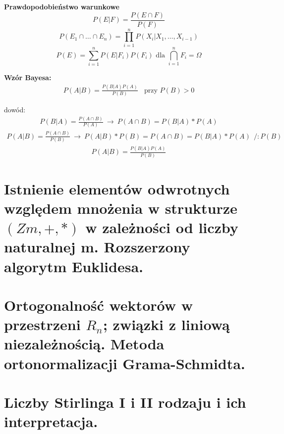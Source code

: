 \documentclass[12pt]{article}
\begin{document}
    \textbf{Prawdopodobieństwo warunkowe}
    \begin{equation}
        P(E|F) = \frac{P(E \cap F)}{P(F)}
    \end{equation}
    \begin{equation}
        P(E_1 \cap \dots \cap E_n) = \prod_{i=1}^{n} P(X_i | X_1, \dots, X_{i-1})
    \end{equation}
    \begin{equation}
        P(E) = \sum_{i=1}^{n} P(E|F_i)P(F_i) \text{ dla } \bigcap_{i=1}^{n} F_i = \Omega
    \end{equation}

    \textbf{Wzór Bayesa:}
    \begin{align*}
        P(A|B) = \frac{P(B|A)P(A)}{P(B)} ~ ~ ~ ~ \text{przy $P(B) > 0$}
    \end{align*}

    dowód:
    \begin{align*}
        P(B|A) = \frac{P(A \cap B)}{P(A)} ~ \rightarrow ~ P(A \cap B) = P(B|A) * P(A)
    \end{align*}
    \begin{align*}
        P(A|B) = \frac{P(A \cap B)}{P(B)} ~ \rightarrow ~ P(A|B)* P(B) = P(A \cap B) = P(B|A) * P(A) ~~ /:P(B)
    \end{align*}
    \begin{align*}
        P(A|B) = \frac{P(B|A)P(A)}{P(B)}
    \end{align*}


    \newpage

    \section{Istnienie elementów odwrotnych względem mnożenia w strukturze $(Zm, +, *)$ w zależności od liczby naturalnej m. Rozszerzony algorytm Euklidesa.}
    \section{Ortogonalność wektorów w przestrzeni $R_n$; związki z liniową niezależnością. Metoda ortonormalizacji Grama-Schmidta.}

    \newpage

    \section{Liczby Stirlinga I i II rodzaju i ich interpretacja.}
\end{document}
